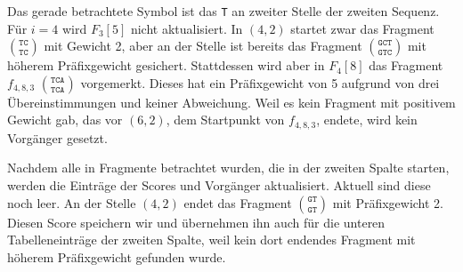Das gerade betrachtete Symbol ist das \texttt{T} an zweiter Stelle der zweiten Sequenz. Für $i=4$ wird $F_3[5]$ nicht aktualisiert. In $(4,2)$ startet zwar das Fragment ${\texttt{TC}}\choose{\texttt{TC}}$ mit Gewicht 2, aber an der Stelle ist bereits das Fragment ${\texttt{GCT}}\choose{\texttt{GTC}}$ mit höherem Präfixgewicht gesichert. Stattdessen wird aber in $F_4[8]$ das Fragment $f_{4,8,3}$ ${\texttt{TCA}}\choose{\texttt{TCA}}$ vorgemerkt. Dieses hat ein Präfixgewicht von 5 aufgrund von drei Übereinstimmungen und keiner Abweichung. Weil es kein Fragment mit positivem Gewicht gab, das vor $(6,2)$, dem Startpunkt von $f_{4,8,3}$, endete, wird kein Vorgänger gesetzt. 
		
Nachdem alle in Fragmente betrachtet wurden, die in der zweiten Spalte starten, werden die Einträge der Scores und Vorgänger aktualisiert. Aktuell sind diese noch leer. An der Stelle $(4,2)$ endet das Fragment  ${\texttt{GT}}\choose{\texttt{GT}}$ mit Präfixgewicht 2. Diesen Score speichern wir und übernehmen ihn auch für die unteren Tabelleneinträge der zweiten Spalte, weil kein dort endendes Fragment mit höherem Präfixgewicht gefunden wurde.

\normalsize	

